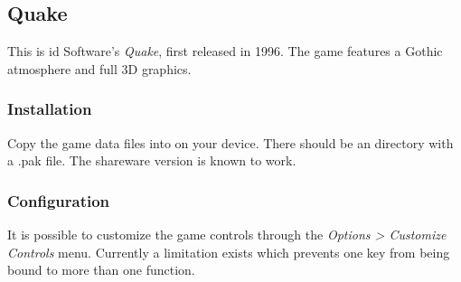 \subsection{Quake}

This is id Software's \emph{Quake}, first released in 1996. The game
features a Gothic atmosphere and full 3D graphics.

\subsubsection{Installation}
Copy the game data files into  on your
device. There should be an  directory with a {.pak}
file. The shareware version is known to work.

\subsubsection{Configuration}
It is possible to customize the game controls through the
\emph{Options > Customize Controls} menu. Currently a limitation
exists which prevents one key from being bound to more than one
function.
